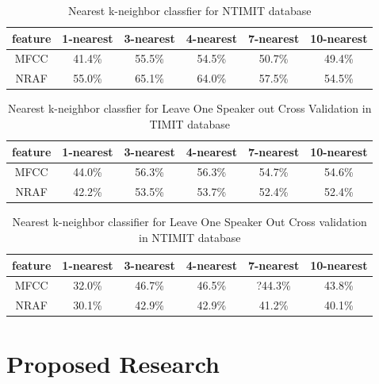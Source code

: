 \documentclass[12pt,letterpaper,doublespaced,ETD,dvips,proposal]{gtthesis}
\begin{document}
\begin{Body}
\begin{table}[!htb]
\footnotesize{ \centering
\begin{tabular}{|c|c|c|c|c|c|}
  \hline
  feature & 1-nearest & 3-nearest & 4-nearest & 7-nearest & 10-nearest \\
  \hline
  MFCC & 41.4\% & 55.5\% & 54.5\% & 50.7\% & 49.4\% \\
  NRAF & 55.0\% & 65.1\% & 64.0\% & 57.5\% & 54.5\% \\
  \hline
\end{tabular}
\caption{Nearest k-neighbor classfier for NTIMIT database} }
\label{kneighborNTIMIT}
\end{table}

\begin{table}[!htb]
\footnotesize{ \centering
\begin{tabular}{|c|c|c|c|c|c|}
  \hline
  feature & 1-nearest & 3-nearest & 4-nearest & 7-nearest & 10-nearest \\
  \hline
  MFCC & 44.0\% & 56.3\% & 56.3\% & 54.7\% & 54.6\% \\
  NRAF & 42.2\% & 53.5\% & 53.7\% & 52.4\% & 52.4\% \\
  \hline
\end{tabular}
\caption{Nearest k-neighbor classfier for
  Leave One Speaker out Cross Validation in TIMIT database}
} \label{kneighborLOOCVTIMIT}
\end{table}

\begin{table}[!htb]
\footnotesize{ \centering
\begin{tabular}{|c|c|c|c|c|c|}
  \hline
  feature & 1-nearest & 3-nearest & 4-nearest & 7-nearest & 10-nearest \\
  \hline
  MFCC & 32.0\% & 46.7\% & 46.5\% & ?44.3\% & 43.8\% \\
  NRAF & 30.1\% & 42.9\% & 42.9\% & 41.2\% & 40.1\% \\
  \hline
\end{tabular}
  \caption{Nearest k-neighbor classifier for Leave One Speaker Out
  Cross validation in  NTIMIT database}
} \label{kneighborLOOCVNTIMIT}
\end{table}

\pagebreak
\newpage
\section{Proposed Research}
\label{proposed}


\end{Body}
\end{document}
